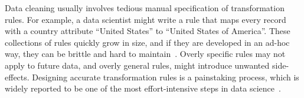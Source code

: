 % 
% 
% 
% 












Data cleaning usually involves tedious manual specification of transformation rules.
For example, a data scientist might write a rule that maps every record with a \textsf{country} attribute ``United States'' to ``United States of America''.
These collections of rules quickly grow in size, and if they are developed in an ad-hoc way, they can be brittle and hard to maintain~\cite{krishnan2016hilda}.
Overly specific rules may not apply to future data, and overly general rules, might introduce unwanted side-effects.
Designing accurate transformation rules is a painstaking process, which is widely reported to be one of the most effort-intensive steps in data science~\cite{nytimes}.

